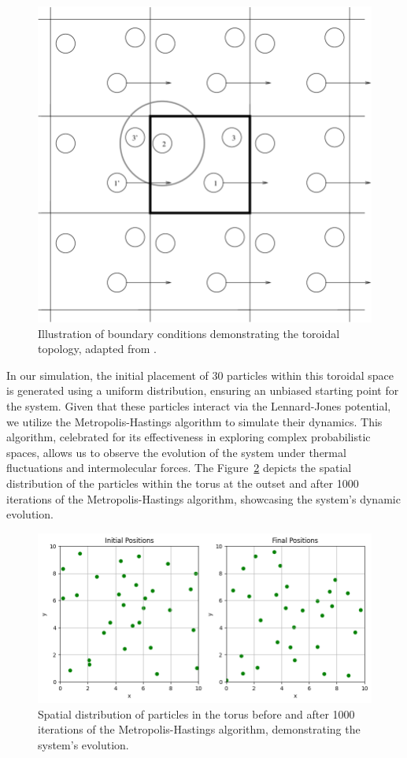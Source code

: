 \documentclass{article}
\begin{document}
\begin{figure}[H]
	\centering
	\includegraphics[width=0.5\linewidth]{./Figures/MCMC/LennardJones/boundaryconditions.png}
	\caption{Illustration of boundary conditions demonstrating the toroidal topology, adapted from \cite{hunt2003arnold}.}
	\label{fig:boundaryconditions}
\end{figure}

In our simulation, the initial placement of 30 particles within this toroidal space is generated using a uniform distribution, ensuring an unbiased starting point for the system. Given that these particles interact via the Lennard-Jones potential, we utilize the Metropolis-Hastings algorithm to simulate their dynamics. This algorithm, celebrated for its effectiveness in exploring complex probabilistic spaces, allows us to observe the evolution of the system under thermal fluctuations and intermolecular forces. The Figure~\ref{fig:particlesmh} depicts the spatial distribution of the particles within the torus at the outset and after 1000 iterations of the Metropolis-Hastings algorithm, showcasing the system's dynamic evolution.

\begin{figure}[H]
	\centering
	\includegraphics[width=0.75\linewidth]{./Figures/MCMC/LennardJones/particles.png}
	\caption{Spatial distribution of particles in the torus before and after 1000 iterations of the Metropolis-Hastings algorithm, demonstrating the system's evolution.}
	\label{fig:particlesmh}
\end{figure}
\end{document}
